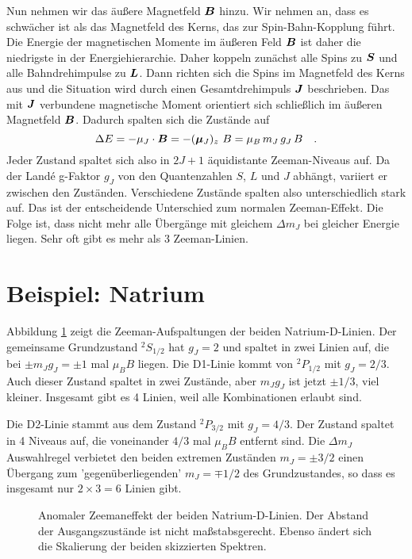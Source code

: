 Nun nehmen wir das äußere Magnetfeld $\boldsymbol{B}$ hinzu. Wir nehmen an, dass es schwächer ist als das Magnetfeld des Kerns, das zur Spin-Bahn-Kopplung führt. Die Energie der magnetischen Momente im äußeren Feld $\boldsymbol{B}$ ist daher die niedrigste in der Energiehierarchie. Daher koppeln zunächst alle Spins zu $\boldsymbol{S}$ und alle Bahndrehimpulse zu $\boldsymbol{L}$. Dann richten sich die Spins im Magnetfeld des Kerns aus und die Situation wird durch einen Gesamtdrehimpuls $\boldsymbol{J}$ beschrieben. Das mit $\boldsymbol{J}$ verbundene magnetische Moment orientiert sich schließlich im äußeren Magnetfeld $\boldsymbol{B}$. Dadurch spalten sich die Zustände  auf
\begin{equation}
    \Delta E = - \mu_J \cdot \boldsymbol{B} =-  (\boldsymbol{\mu}_J)_z  \, \, B =  \mu_B \, m_J \, g_J \, B  \quad .
\end{equation}
Jeder Zustand spaltet sich also in $2J+1$ äquidistante Zeeman-Niveaus auf. Da der Landé g-Faktor $g_J$ von den Quantenzahlen $S$, $L$ und $J$ abhängt, variiert er zwischen den Zuständen. Verschiedene Zustände spalten also unterschiedlich stark auf. Das ist der entscheidende Unterschied zum normalen Zeeman-Effekt. Die Folge ist, dass nicht mehr alle Übergänge mit gleichem $\Delta m_J$ bei gleicher Energie liegen. Sehr oft gibt es mehr als 3 Zeeman-Linien. 

\section{Beispiel: Natrium}

Abbildung \ref{fig:8_natrium_Bfeld} zeigt die Zeeman-Aufspaltungen der beiden Natrium-D-Linien. Der gemeinsame Grundzustand $^2S_{1/2}$ hat $g_J = 2$ und spaltet in zwei Linien auf, die bei $\pm m_J g_J = \pm 1$ mal $\mu_B B$ liegen. Die D1-Linie kommt von $^2P_{1/2}$ mit $g_J = 2/3$. Auch dieser Zustand spaltet in zwei Zustände, aber $m_J  g_J$ ist jetzt $\pm 1/3$, viel kleiner. Insgesamt gibt es 4 Linien, weil alle Kombinationen erlaubt sind.


Die D2-Linie stammt aus dem Zustand $^2P_{3/2}$ mit $g_J = 4/3$. Der Zustand spaltet in 4 Niveaus auf, die voneinander $4/3$ mal $\mu_B B$ entfernt sind. Die $\Delta m_J$ Auswahlregel verbietet den beiden extremen Zuständen $m_J = \pm 3/2$ einen Übergang zum 'gegenüberliegenden' $m_J = \mp 1/2$ des Grundzustandes, so dass es insgesamt nur $2 \times 3 = 6$ Linien gibt.


\begin{figure}
    \caption{Anomaler Zeemaneffekt der beiden Natrium-D-Linien. Der Abstand der Ausgangszustände ist nicht maßstabsgerecht. Ebenso ändert sich die Skalierung der beiden skizzierten Spektren.}
    \label{fig:8_natrium_Bfeld}
\end{figure}


